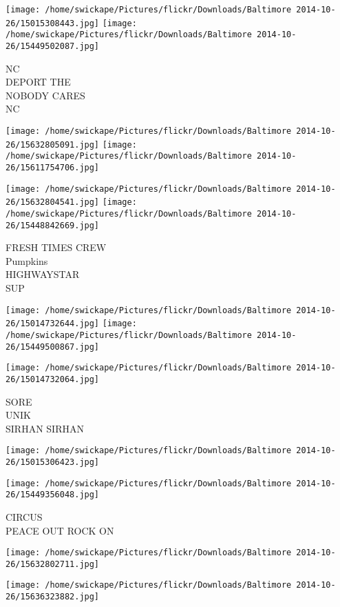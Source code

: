 \documentclass[10pt,letterpaper]{article}
\begin{document}
\texttt{[image: /home/swickape/Pictures/flickr/Downloads/Baltimore 2014-10-26/15015308443.jpg]}
\texttt{[image: /home/swickape/Pictures/flickr/Downloads/Baltimore 2014-10-26/15449502087.jpg]}

NC\\
DEPORT THE\\
NOBODY CARES\\
NC
\pagebreak

\texttt{[image: /home/swickape/Pictures/flickr/Downloads/Baltimore 2014-10-26/15632805091.jpg]}
\texttt{[image: /home/swickape/Pictures/flickr/Downloads/Baltimore 2014-10-26/15611754706.jpg]}

\texttt{[image: /home/swickape/Pictures/flickr/Downloads/Baltimore 2014-10-26/15632804541.jpg]}
\texttt{[image: /home/swickape/Pictures/flickr/Downloads/Baltimore 2014-10-26/15448842669.jpg]}

FRESH TIMES CREW\\
Pumpkins\\
HIGHWAYSTAR\\
SUP
\pagebreak

\texttt{[image: /home/swickape/Pictures/flickr/Downloads/Baltimore 2014-10-26/15014732644.jpg]}
\texttt{[image: /home/swickape/Pictures/flickr/Downloads/Baltimore 2014-10-26/15449500867.jpg]}

\texttt{[image: /home/swickape/Pictures/flickr/Downloads/Baltimore 2014-10-26/15014732064.jpg]}

SORE\\
UNIK\\
SIRHAN SIRHAN
\pagebreak

\texttt{[image: /home/swickape/Pictures/flickr/Downloads/Baltimore 2014-10-26/15015306423.jpg]}

\vspace{0.25in}
\texttt{[image: /home/swickape/Pictures/flickr/Downloads/Baltimore 2014-10-26/15449356048.jpg]}

CIRCUS\\
PEACE OUT ROCK ON
\pagebreak

\texttt{[image: /home/swickape/Pictures/flickr/Downloads/Baltimore 2014-10-26/15632802711.jpg]}

\vspace{0.25in}
\texttt{[image: /home/swickape/Pictures/flickr/Downloads/Baltimore 2014-10-26/15636323882.jpg]}
\end{document}
